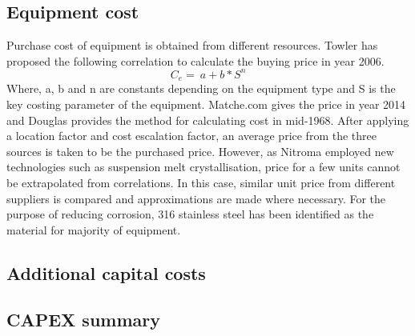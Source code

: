 \subsection{Equipment cost}
Purchase cost of equipment is obtained from different resources. Towler\cite{sinnott_chemical_2020} has proposed the following correlation to calculate the buying price in year 2006.
\begin{equation}
    C_{e}=\ a+b*S^n
\end{equation}
Where, a, b and n are constants depending on the equipment type and S is the key costing parameter of the equipment. Matche.com gives the price in year 2014 and Douglas provides the method for calculating cost in mid-1968. After applying a location factor and cost escalation factor, an average price from the three sources is taken to be the purchased price. However, as Nitroma employed new technologies such as suspension melt crystallisation, price for a few units cannot be extrapolated from correlations. In this case, similar unit price from different suppliers is compared and approximations are made where necessary. For the purpose of reducing corrosion, 316 stainless steel has been identified as the material for majority of equipment.




\subsection{Additional capital costs}
\subsection{CAPEX summary}
